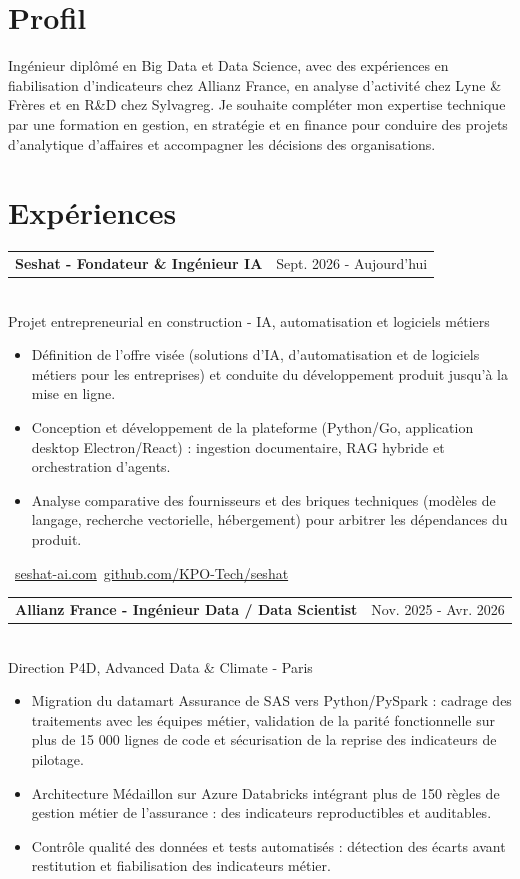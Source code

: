 \documentclass[10pt,a4paper]{article}
\makeatletter
\newcommand{\role}[3]{%
  \vspace{2pt}
  \begin{tabularx}{\linewidth}{@{}Xr@{}}
  \textbf{#1} & {\color{muted}#2}
  \end{tabularx}\vspace{0.8pt}\\
  {\color{muted}#3}\par
  \vspace{2pt}
}
\makeatother
\begin{document}
\begin{lrbox}{\maincolumnbox}
\begin{minipage}[t]{0.695\textwidth}
\vspace{0pt}
\raggedright

\section{Profil}
Ingénieur diplômé en Big Data et Data Science, avec des expériences en fiabilisation d'indicateurs chez Allianz France, en analyse d'activité chez Lyne \& Frères et en R\&D chez Sylvagreg. Je souhaite compléter mon expertise technique par une formation en gestion, en stratégie et en finance pour conduire des projets d'analytique d'affaires et accompagner les décisions des organisations.

\section{Expériences}
\role{Seshat - Fondateur \& Ingénieur IA}{Sept. 2026 - Aujourd'hui}{Projet entrepreneurial en construction - IA, automatisation et logiciels métiers}
\begin{itemize}
  \item Définition de l'offre visée (solutions d'IA, d'automatisation et de logiciels métiers pour les entreprises) et conduite du développement produit jusqu'à la mise en ligne.
  \item Conception et développement de la plateforme (Python/Go, application desktop Electron/React) : ingestion documentaire, RAG hybride et orchestration d'agents.
  \item Analyse comparative des fournisseurs et des briques techniques (modèles de langage, recherche vectorielle, hébergement) pour arbitrer les dépendances du produit.
\end{itemize}
{\footnotesize\color{accent}\ \href{https://seshat-ai.com}{seshat-ai.com}\enspace\textbullet\enspace{}\ \href{https://github.com/KPO-Tech/seshat}{github.com/KPO-Tech/seshat}}\par

\vspace{4pt}
\role{Allianz France - Ingénieur Data / Data Scientist}{Nov. 2025 - Avr. 2026}{Direction P4D, Advanced Data \& Climate - Paris}
\begin{itemize}
  \item Migration du datamart Assurance de SAS vers Python/PySpark : cadrage des traitements avec les équipes métier, validation de la parité fonctionnelle sur plus de 15 000 lignes de code et sécurisation de la reprise des indicateurs de pilotage.
  \item Architecture Médaillon sur Azure Databricks intégrant plus de 150 règles de gestion métier de l'assurance : des indicateurs reproductibles et auditables.
  \item Contrôle qualité des données et tests automatisés : détection des écarts avant restitution et fiabilisation des indicateurs métier.
\end{itemize}


\end{minipage}
\end{lrbox}
\end{document}
